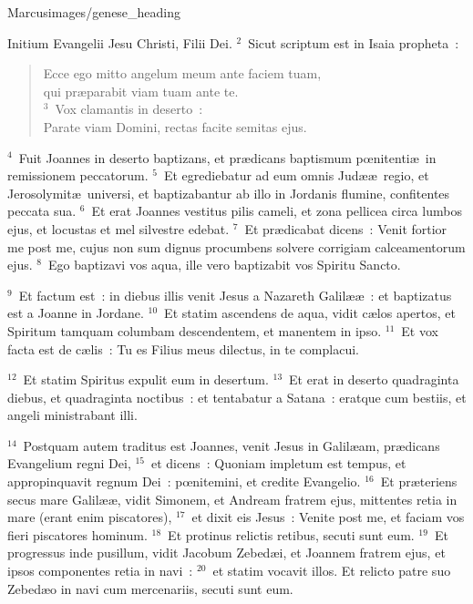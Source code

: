 {Marcus}{images/genese_heading}


\lettrine[lines=10,image=true,loversize=0.05,lraise=-0.03]{I}{}nitium Evangelii Jesu Christi, Filii Dei.
${}^{2}$~Sicut scriptum est in Isaia propheta~: \begin{flushleft}\begin{verse}Ecce ego mitto angelum meum ante faciem tuam,\\ qui pr\ae parabit viam tuam ante te.\\
${}^{3}$~Vox clamantis in deserto~:\\ Parate viam Domini, rectas facite semitas ejus.\end{verse}\end{flushleft}


${}^{4}$~Fuit Joannes in deserto baptizans, et pr\ae dicans baptismum pœnitenti\ae\ in remissionem peccatorum.
${}^{5}$~Et egrediebatur ad eum omnis Jud\ae \ae\ regio, et Jerosolymit\ae\ universi, et baptizabantur ab illo in Jordanis flumine, confitentes peccata sua.
${}^{6}$~Et erat Joannes vestitus pilis cameli, et zona pellicea circa lumbos ejus, et locustas et mel silvestre edebat.
${}^{7}$~Et pr\ae dicabat dicens~: Venit fortior me post me, cujus non sum dignus procumbens solvere corrigiam calceamentorum ejus.
${}^{8}$~Ego baptizavi vos aqua, ille vero baptizabit vos Spiritu Sancto.


${}^{9}$~Et factum est~: in diebus illis venit Jesus a Nazareth Galil\ae \ae~: et baptizatus est a Joanne in Jordane.
${}^{10}$~Et statim ascendens de aqua, vidit c\ae los apertos, et Spiritum tamquam columbam descendentem, et manentem in ipso.
${}^{11}$~Et vox facta est de c\ae lis~: Tu es Filius meus dilectus, in te complacui.


${}^{12}$~Et statim Spiritus expulit eum in desertum.
${}^{13}$~Et erat in deserto quadraginta diebus, et quadraginta noctibus~: et tentabatur a Satana~: eratque cum bestiis, et angeli ministrabant illi.


${}^{14}$~Postquam autem traditus est Joannes, venit Jesus in Galil\ae am, pr\ae dicans Evangelium regni Dei,
${}^{15}$~et dicens~: Quoniam impletum est tempus, et appropinquavit regnum Dei~: pœnitemini, et credite Evangelio.
${}^{16}$~Et pr\ae teriens secus mare Galil\ae \ae , vidit Simonem, et Andream fratrem ejus, mittentes retia in mare (erant enim piscatores),
${}^{17}$~et dixit eis Jesus~: Venite post me, et faciam vos fieri piscatores hominum.
${}^{18}$~Et protinus relictis retibus, secuti sunt eum.
${}^{19}$~Et progressus inde pusillum, vidit Jacobum Zebed\ae i, et Joannem fratrem ejus, et ipsos componentes retia in navi~:
${}^{20}$~et statim vocavit illos. Et relicto patre suo Zebed\ae o in navi cum mercenariis, secuti sunt eum.


